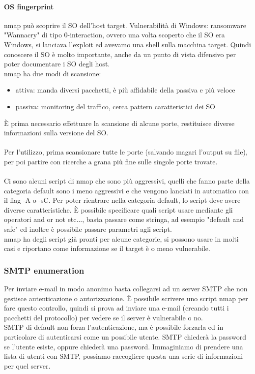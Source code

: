 \documentclass{article}
\begin{document}
\paragraph{OS fingerprint}nmap può scoprire il SO dell'host target. Vulnerabilità di Windows: ransomware "Wannacry" di tipo 0-interaction, ovvero una volta scoperto che il SO era Windows, si lanciava l'exploit ed avevamo una shell sulla macchina target. Quindi conoscere il SO è molto importante, anche da un punto di vista difensivo per poter documentare i SO degli host.\\ nmap ha due modi di scansione:
\begin{itemize}
\item attiva: manda diversi pacchetti, è più affidabile della passiva e più veloce
\item passiva: monitoring del traffico, cerca pattern caratteristici dei SO
\end{itemize}
È prima necessario effettuare la scansione di alcune porte, restituisce diverse informazioni sulla versione del SO.\\\\ Per l'utilizzo, prima scansionare tutte le porte (salvando magari l'output su file), per poi partire con ricerche a grana più fine sulle singole porte trovate.
\\\\ Ci sono alcuni script di nmap che sono più aggressivi, quelli che fanno parte della categoria default sono i meno aggressivi e che vengono lanciati in automatico con il flag -A o -sC. Per poter rientrare nella categoria default, lo script deve avere diverse caratteristiche. È possibile specificare quali script usare mediante gli operatori and or not etc..., basta passare come stringa, ad esempio "default and safe" ed inoltre è possibile passare parametri agli script.\\
nmap ha degli script già pronti per alcune categorie, si possono usare in molti casi e riportano come informazione se il target è o meno vulnerabile.
\subsubsection{SMTP enumeration}
Per inviare e-mail in modo anonimo basta collegarsi ad un server SMTP che non gestisce autenticazione o autorizzazione. È possibile scrivere uno script nmap per fare questo controllo, quindi si prova ad inviare una e-mail (creando tutti i pacchetti del protocollo) per vedere se il server è vulnerabile o no.\\ SMTP di default non forza l'autenticazione, ma è possibile forzarla ed in particolare di autenticarsi come un possibile utente. SMTP chiederà la password se l'utente esiste, oppure chiederà una password. Immaginiamo di prendere una lista di utenti con SMTP, possiamo raccogliere questa una serie di informazioni per quel server.
\end{document}
